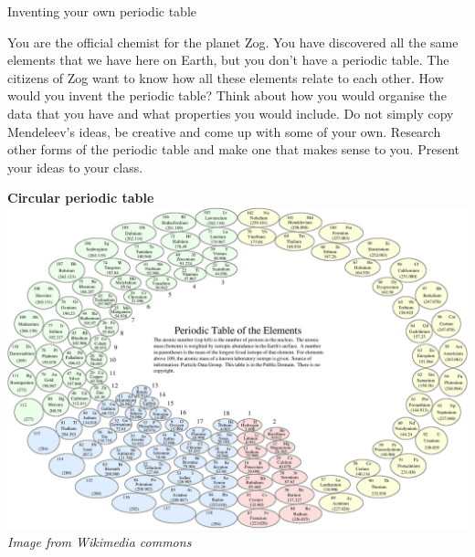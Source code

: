 \begin{activity}{Inventing your own periodic table}
            \nopagebreak
            \label{m38760*eip-603}
\begin{minipage}{.5\textwidth}
You are the official chemist for the planet Zog. You have discovered all the same elements that we have here on Earth, but you don't have a periodic table. The citizens of Zog want to know how all these elements relate to each other. How would you invent the periodic table? Think about how you would organise the data that you have and what properties you would include. Do not simply copy Mendeleev's ideas, be creative and come up with some of your own. Research other forms of the periodic table and make one that makes sense to you. Present your ideas to your class. 
\end{minipage}
\begin{minipage}{.5\textwidth}
\begin{center}
\textbf{Circular periodic table}\\
\includegraphics[width=.9\textwidth]{photos/Circular_periodic_table.png}\\
\textsl{Image from Wikimedia commons}
\end{center}
\end{minipage}

\end{activity}
            \nopagebreak
